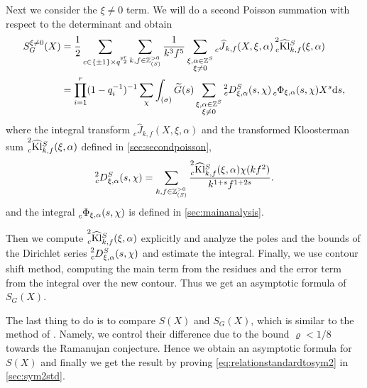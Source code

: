 \documentclass[10pt,oneside,reqno]{amsart}
\newcommand\rmd{\mathrm{d}}
\newcommand\FF{\mathbb{F}}
\newcommand\ZZ{\mathbb{Z}}
\newcommand\Kl{\mathrm{Kl}}
\theoremstyle{THEOREM}
\theoremstyle{DEFINITION}
\theoremstyle{EXERCISE}
\numberwithin{equation}{section}
\begin{document}
Next we consider the $\xi\neq 0$ term. We will do a second Poisson summation with respect to the determinant and obtain 
\begin{align*}
S_G^{\xi\neq 0}(X)&=\frac12\sum_{c\in \{\pm 1\}\times q^{\FF_2^r}}\sum_{k,f\in \ZZ_{(S)}^{>0}}\frac{1}{k^3f^5}\sum_{\substack{\xi,\alpha\in \ZZ^S\\\xi\neq 0}} \prescript{}{c} {\widehat{J}}_{k,f}(X,\xi,\alpha)\prescript{2}{c}{\widehat{\Kl}}_{k,f}^S(\xi,\alpha)\\
&=\prod_{i=1}^{r}(1-q_i^{-1})^{-1}\sum_{\chi}\int_{(\sigma)} \widetilde{G}(s)\sum_{\substack{\xi,\alpha\in \ZZ^S\\\xi\neq 0}}\prescript{2}{c}D_{\xi,\alpha}^S(s,\chi)\prescript{}{c}\Phi_{\xi,\alpha}(s,\chi)X^s\rmd s,
\end{align*}
where the integral transform $_c\widehat{J}_{k,f}(X,\xi,\alpha)$ and the transformed Kloosterman sum $\prescript{2}{c}{\widehat{\Kl}}_{k,f}^S(\xi,\alpha)$ defined in \autoref{sec:secondpoisson},
\[  
\prescript{2}{c}D_{\xi,\alpha}^S(s,\chi)=\sum_{k,f\in \ZZ_{(S)}^{>0}}\frac{\prescript{2}{c}{\widehat{\Kl}}_{k,f}^{S}(\xi,\alpha)\chi(kf^2)}{k^{1+s}f^{1+2s}}.
\]
and the integral $\prescript{}{c}\Phi_{\xi,\alpha}(s,\chi)$ is defined in \autoref{sec:mainanalysis}.

Then we compute $\prescript{2}{c}{\widehat{\Kl}}_{k,f}^S(\xi,\alpha)$ explicitly and analyze the poles and the bounds of the Dirichlet series $\prescript{2}{c}D_{\xi,\alpha}^S(s,\chi)$ and estimate the integral. Finally, we use contour shift method, computing the main term from the residues and the error term from the integral over the new contour. Thus we get an asymptotic formula of $S_G(X)$.

The last thing to do is to compare $S(X)$ and $S_G(X)$, which is similar to the method of \cite{cheng2025c}. Namely, we control their difference due to the bound $\varrho<1/8$ towards the Ramanujan conjecture. Hence we obtain an asymptotic formula for $S(X)$ and finally we get the result by proving \eqref{eq:relationstandardtosym2} in \autoref{sec:sym2std}.
\end{document}
